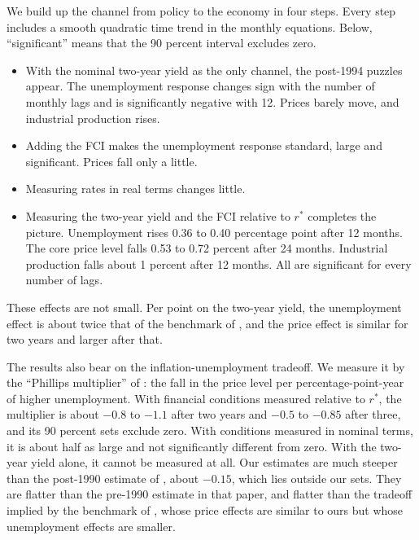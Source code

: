 \documentclass[11pt]{article}
\newcommand{\rs}{r^{*}}
\begin{document}
We build up the channel from policy to the economy in four steps. Every step includes a smooth quadratic time trend in the monthly equations. Below, ``significant'' means that the 90 percent interval excludes zero.
\begin{itemize}
\item With the nominal two-year yield as the only channel, the post-1994 puzzles appear. The unemployment response changes sign with the number of monthly lags and is significantly negative with 12. Prices barely move, and industrial production rises.
\item Adding the FCI makes the unemployment response standard, large and significant. Prices fall only a little.
\item Measuring rates in real terms changes little.
\item Measuring the two-year yield and the FCI relative to $\rs$ completes the picture. Unemployment rises 0.36 to 0.40 percentage point after 12 months. The core price level falls 0.53 to 0.72 percent after 24 months. Industrial production falls about 1 percent after 12 months. All are significant for every number of lags.
\end{itemize}
These effects are not small. Per point on the two-year yield, the unemployment effect is about twice that of the benchmark of \citet{bauer2023}, and the price effect is similar for two years and larger after that.

The results also bear on the inflation-unemployment tradeoff. We measure it by the ``Phillips multiplier'' of \citet{barnichon2021}: the fall in the price level per percentage-point-year of higher unemployment. With financial conditions measured relative to $\rs$, the multiplier is about $-0.8$ to $-1.1$ after two years and $-0.5$ to $-0.85$ after three, and its 90 percent sets exclude zero. With conditions measured in nominal terms, it is about half as large and not significantly different from zero. With the two-year yield alone, it cannot be measured at all. Our estimates are much steeper than the post-1990 estimate of \citet{barnichon2021}, about $-0.15$, which lies outside our sets. They are flatter than the pre-1990 estimate in that paper, and flatter than the tradeoff implied by the benchmark of \citet{bauer2023}, whose price effects are similar to ours but whose unemployment effects are smaller.
\end{document}
